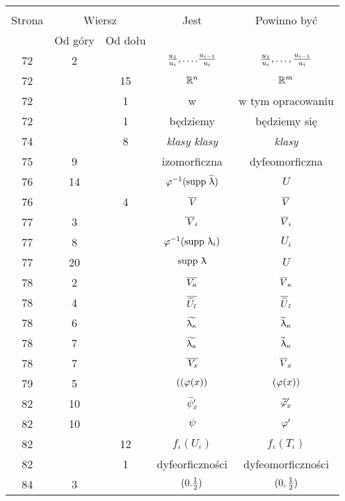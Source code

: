 \documentclass[a4paper,11pt]{article}
\begin{document}
\begin{center}
  \begin{tabular}{|c|c|c|c|c|}
    \hline
    & \multicolumn{2}{c|}{} & & \\
    Strona & \multicolumn{2}{c|}{Wiersz} & Jest
                              & Powinno być \\ \cline{2-3}
    & Od góry & Od dołu &  &  \\
    \hline
    72  &  2 & & $\frac{ u_{ 1 } }{ u_{ i } }, \ldots. \frac{ u_{ i - 1 } }{ u_{ i } }$
           & $\frac{ u_{ 1 } }{ u_{ i } }, \ldots, \frac{ u_{ i - 1 } }{ u_{ i } }$ \\
    72  & & 15 & $\mathbb{R}^{ n }$ & $\mathbb{R}^{ m }$ \\
    72  & &  1 & w & w tym opracowaniu \\
    72  & &  1 & będziemy & będziemy się \\
    74  & &  8 & \emph{klasy klasy} & \emph{klasy} \\
    75  &  9 & & izomorficzna & dyfeomorficzna \\
    76  & 14 & & $\varphi^{ -1 }( \mathrm{supp}\, \, \widetilde{ \uplambda } )$ & $U$ \\
    76  & &  4 & $\overline{ \, V }$ & $\overline{ V }$ \\
    77  &  3 & & $\overline{\, V}_{ i }$ & $\overline{ V }_{ i }$ \\
    77  &  8 & & $\varphi^{ -1 }( \mathrm{supp}\, \, \uplambda_{ i } )$ & $U_{ i }$ \\
    77  & 20 & & $\mathrm{supp}\, \, \uplambda$ & $U$ \\
    78  &  2 & & $\overline{ V_{ \kappa } }$ & $\overline{ V }_{ \kappa }$ \\
    78  &  4 & & $\overline{ \widetilde{ U }_{ \tilde{ \iota } } }$
           & $\overline{ \widetilde{ U } }_{ \tilde{ \iota } }$ \\
    78  &  6 & & $\widetilde{ \uplambda_{ \kappa } }$ & $\widetilde{ \uplambda }_{ \kappa }$ \\
    78  &  7 & & $\widetilde{ \uplambda_{ \kappa } }$ & $\widetilde{ \uplambda }_{ \kappa }$ \\
    78  &  7 & & $\overline{ \, V_{ x } }$ & $\overline{ V }_{ x }$ \\
    79  &  5 & & $( ( \varphi( x ) )$ & $( \varphi( x ) )$ \\
    82  & 10 & & $\widetilde{ \psi }'_{ x }$
           & $\widetilde{ \varphi }'_{ x }$ \\
    82  & 10 & & $\psi$ & $\varphi'$ \\
    82  & & 12 & $f_{ \iota }( U_{ \iota } )$ & $f_{ \iota }( T_{ \iota } )$ \\
    82  & &  1 & dyfeorficzności & dyfeomorficzności \\
    84  &  3 & & $( 0. \frac{ 1 }{ 2 } )$ & $( 0, \frac{ 1 }{ 2 } )$ \\

\end{tabular}
\end{center}
\end{document}
